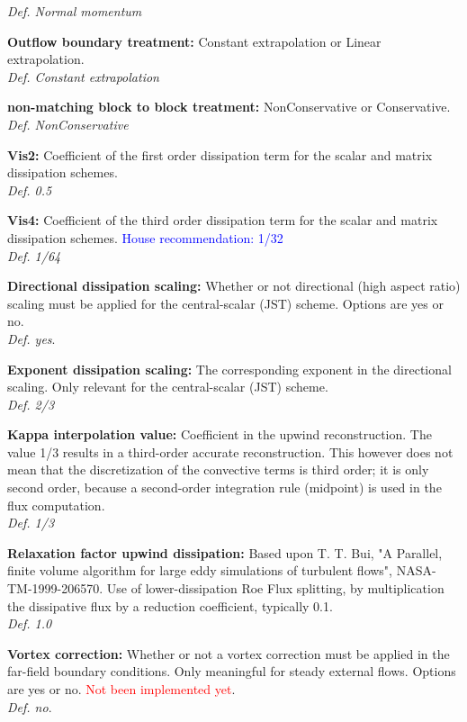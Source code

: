 \documentclass[12pt,epsf,colordvi]{article}
\begin{document}
\begin{description}
{\it Def.  Normal momentum }
%
  \item{\bf Outflow boundary treatment:}  Constant extrapolation or  Linear extrapolation. \\
{\it Def. Constant extrapolation }
%
 \item{\bf non-matching block to block treatment: } NonConservative or Conservative. \\
{\it Def. NonConservative}
%
     \item{\bf Vis2:}  Coefficient of the first order dissipation term for the scalar and matrix dissipation schemes. \\
{\it Def. 0.5}
    \item{\bf Vis4:}  Coefficient of the third order dissipation term for the scalar and matrix dissipation schemes. \textcolor{blue}{House recommendation: 1/32} \\ 
{\it Def.  1/64}
%
     \item{\bf Directional dissipation scaling:} Whether or not directional (high aspect ratio) scaling must be applied for the central-scalar (JST) scheme. Options are yes or no. \\
{\it Def. yes}.
%
     \item{\bf Exponent dissipation scaling:} The corresponding exponent in the directional scaling. Only relevant for the central-scalar (JST) scheme. \\ 
{\it Def. 2/3}
%
     \item{\bf Kappa interpolation value:} Coefficient in the upwind reconstruction. The value 1/3 results in a third-order accurate reconstruction. This however does not mean that the discretization of the convective terms is third order; it is only second order, because a second-order integration rule (midpoint) is used in the flux computation. \\
{\it Def.  1/3}
%
      \item{\bf Relaxation factor upwind dissipation: } Based upon T. T. Bui, "A Parallel, finite volume algorithm for large eddy   simulations of turbulent flows",  NASA-TM-1999-206570. Use of  lower-dissipation Roe Flux splitting, by multiplication the  dissipative flux  by a reduction coefficient, typically 0.1.  \\
{\it Def. 1.0}
%
    \item{\bf  Vortex correction:} Whether or not a vortex correction must be applied in the far-field boundary conditions. Only meaningful for steady external flows. Options are yes or no. \textcolor{red}{Not been implemented yet}. \\
{\it Def. no}.  

\end{description}
%
%
\noindent 
\end{document}
